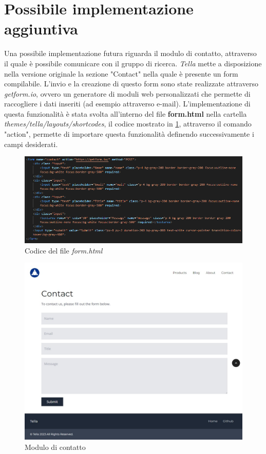 \documentclass[target=bach,aauheader=]{thud}
\begin{document}
\section{Possibile implementazione aggiuntiva}
Una possibile implementazione futura riguarda il modulo di contatto, attraverso il quale è possibile comunicare con il gruppo di ricerca.
\textit{Tella} mette a disposizione nella versione originale la sezione "Contact" nella quale è presente un form compilabile.
L'invio e la creazione di questo form sono state realizzate attraverso \textit{getform.io}, ovvero un generatore di moduli web personalizzati che permette di raccogliere i dati inseriti (ad esempio attraverso e-mail). 
L'implementazione di questa funzionalità è stata svolta all'interno del file \textbf{form.html} nella cartella \textit{themes/tella/layouts/shortcodes}, il codice mostrato in \cref{img:formc}, attraverso il comando "action", permette di importare questa funzionalità definendo successivamente i campi desiderati.

\begin{figure}
    \centering
      \includegraphics[width=1\textwidth]{images/form-html.png}
      \caption{Codice del file \textit{form.html}}
      \label{img:formc}
\end{figure}

\begin{figure}
    \centering
    \includegraphics[width = 1\textwidth]{images/form-tella.png}
    \caption{Modulo di contatto} 
\end{figure}
\end{document}
